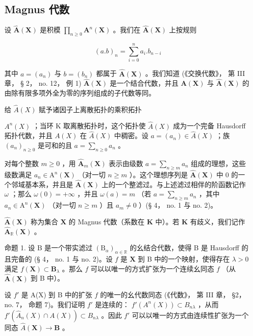 \subsection{Magnus 代数}

设 \(\hat{\mathbf{A}}(\mathbf{X})\) 是积模 \(\prod_{n\geqslant 0}\mathbf{A}^n (\mathbf{X})\) 。我们在 \(\hat{\mathbf{A}}(\mathbf{X})\) 上按规则

\[
(a. b) _ {n} = \sum_ {i = 0} ^ {n} a _ {i}. b _ {n - i}\tag{1}
\]

其中 \(a = (a_{n})\) 与 \(b = (b_{n})\) 都属于 \(\hat{\mathbf{A}}(\mathbf{X})\) 。我们知道 (《交换代数》， 第 III 章， § 2， no. 12， 例 1) \(\hat{\mathbf{A}}(\mathbf{X})\) 是一个结合代数，并且 \(\mathbf{A}(\mathbf{X})\) 与 \(\hat{\mathbf{A}}(\mathbf{X})\) 的由除有限多项外全为零的序列组成的子代数等同。

给 \(\hat{A}(X)\) 赋予诸因子上离散拓扑的乘积拓扑

\(A^{n}(X)\) ；当环 K 取离散拓扑时，这个拓扑使 \(\hat{A}(X)\) 成为一个完备 Hausdorff 拓扑代数，并且 \(A(X)\) 在 \(\hat{A}(X)\) 中稠密。设 \(a = (a_{n}) \in \hat{A}(X)\) ；族 \((a_{n})_{n \geqslant 0}\) 是可和的且 \(a = \sum_{n \geqslant 0} a_{n}\) 。

对每个整数 \(m \geqslant 0\) ，用 \(\hat{\mathbf{A}}_m(\mathbf{X})\) 表示由级数 \(a = \sum_{n \geqslant m} a_n\) 组成的理想，这些级数满足 \(a_n \in \mathrm{A}^n(\mathbf{X})\) （对一切 \(n \geqslant m\) ）。这个理想序列是 \(\hat{\mathbf{A}}(\mathbf{X})\) 中 0 的一个邻域基本系，并且是 \(\hat{\mathbf{A}}(\mathbf{X})\) 上的一个整滤过。与上述滤过相伴的阶函数记作 \(\omega\) ；那么 \(\omega(0) = +\infty\) ，并且 \(\omega(a) = m\) （若 \(a = \sum_{n \geqslant m} a_n\) ，其中 \(a_n \in \mathrm{A}^n(\mathbf{X})\) （对一切 \(n \geqslant m\) ）且 \(a_m \neq 0\) ）(§ 4， no. 1 与 no. 2)。

\(\hat{\mathbf{A}}(\mathbf{X})\) 称为集合 \(\mathbf{X}\) 的 Magnus 代数（系数在 \(\mathbf{K}\) 中）。若 \(\mathbf{K}\) 有歧义，我们记作 \(\hat{\mathbf{A}}_{\mathbb{R}}(\mathbf{X})\) 。

命题 1. 设 B 是一个带实滤过 \((\mathrm{B}_{\alpha})_{\alpha \in \mathbb{R}}\) 的幺结合代数，使得 B 是 Hausdorff 的且完备的 (§ 4， no. 1 与 no. 2)。设 \(f\) 是 \(\mathbf{X}\) 到 B 中的一个映射，使得存在 \(\lambda > 0\) 满足 \(f(\mathbf{X}) \subset \mathbf{B}_{\lambda}\) 。那么 \(f\) 可以以唯一的方式扩张为一个连续幺同态 \(f\) （从 \(\hat{\mathbf{A}}(\mathbf{X})\) 到 B 中）。

设 \(f'\) 是 A(X) 到 B 中的扩张 \(f\) 的唯一的幺代数同态 (《代数》， 第 III 章， \S 2， no. 7， 命题 7)。我们证明 \(f'\) 是连续的： \(f'(A^n(X)) \subset B_{n\lambda}\) ，从而 \(f'(\hat{A}_n(X) \cap A(X)) \subset B_{n\lambda}\) 。因此 \(f'\) 可以以唯一的方式由连续性扩张为一个同态 \(\hat{A}(\mathbf{X}) \to \mathbf{B}\) 。


